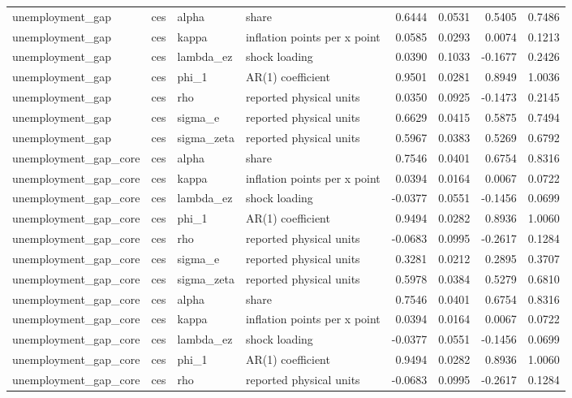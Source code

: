 \begin{tabular}{llllrrrr}
unemployment\_gap & ces & alpha & share & 0.6444 & 0.0531 & 0.5405 & 0.7486 \\
unemployment\_gap & ces & kappa & inflation points per x point & 0.0585 & 0.0293 & 0.0074 & 0.1213 \\
unemployment\_gap & ces & lambda\_ez & shock loading & 0.0390 & 0.1033 & -0.1677 & 0.2426 \\
unemployment\_gap & ces & phi\_1 & AR(1) coefficient & 0.9501 & 0.0281 & 0.8949 & 1.0036 \\
unemployment\_gap & ces & rho & reported physical units & 0.0350 & 0.0925 & -0.1473 & 0.2145 \\
unemployment\_gap & ces & sigma\_e & reported physical units & 0.6629 & 0.0415 & 0.5875 & 0.7494 \\
unemployment\_gap & ces & sigma\_zeta & reported physical units & 0.5967 & 0.0383 & 0.5269 & 0.6792 \\
unemployment\_gap\_core & ces & alpha & share & 0.7546 & 0.0401 & 0.6754 & 0.8316 \\
unemployment\_gap\_core & ces & kappa & inflation points per x point & 0.0394 & 0.0164 & 0.0067 & 0.0722 \\
unemployment\_gap\_core & ces & lambda\_ez & shock loading & -0.0377 & 0.0551 & -0.1456 & 0.0699 \\
unemployment\_gap\_core & ces & phi\_1 & AR(1) coefficient & 0.9494 & 0.0282 & 0.8936 & 1.0060 \\
unemployment\_gap\_core & ces & rho & reported physical units & -0.0683 & 0.0995 & -0.2617 & 0.1284 \\
unemployment\_gap\_core & ces & sigma\_e & reported physical units & 0.3281 & 0.0212 & 0.2895 & 0.3707 \\
unemployment\_gap\_core & ces & sigma\_zeta & reported physical units & 0.5978 & 0.0384 & 0.5279 & 0.6810 \\
unemployment\_gap\_core & ces & alpha & share & 0.7546 & 0.0401 & 0.6754 & 0.8316 \\
unemployment\_gap\_core & ces & kappa & inflation points per x point & 0.0394 & 0.0164 & 0.0067 & 0.0722 \\
unemployment\_gap\_core & ces & lambda\_ez & shock loading & -0.0377 & 0.0551 & -0.1456 & 0.0699 \\
unemployment\_gap\_core & ces & phi\_1 & AR(1) coefficient & 0.9494 & 0.0282 & 0.8936 & 1.0060 \\
unemployment\_gap\_core & ces & rho & reported physical units & -0.0683 & 0.0995 & -0.2617 & 0.1284 \\

\end{tabular}
